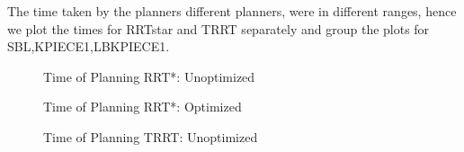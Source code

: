 The time taken by the planners different planners, were in different ranges, hence we plot the times for RRTstar and TRRT separately and group the plots for SBL,KPIECE1,LBKPIECE1. 
\begin{figure}[!htbp] %
	\centering
	\caption{Time of Planning RRT*: Unoptimized}
	\label{fig:tc1}
\end{figure}
\begin{figure}[!htbp] %
	\centering
	\caption{Time of Planning RRT*: Optimized}
	\label{fig:tc2}
\end{figure}
\begin{figure}[!htbp] %
	\centering
	\caption{Time of Planning TRRT: Unoptimized}
	\label{fig:tc3}
\end{figure}
